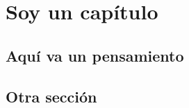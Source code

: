 \chapter{Soy un capítulo}

\noindent \lipsum[1-2]

\section{Aquí va un pensamiento}

\noindent \lipsum

\section{Otra sección}

\noindent \lipsum